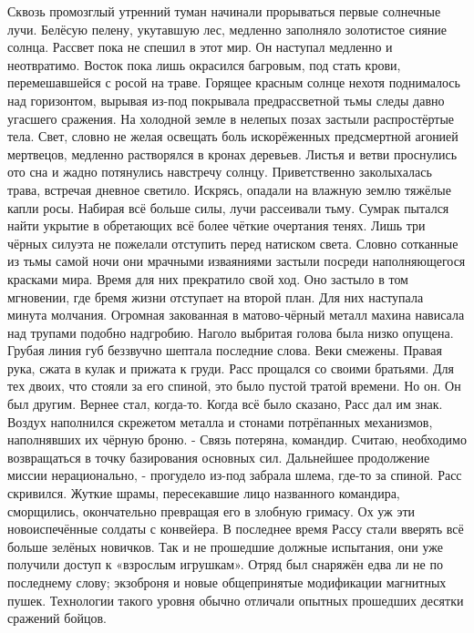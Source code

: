 \documentclass[a4paper, 12pt]{report}
\begin{document}
Сквозь промозглый утренний туман начинали прорываться первые солнечные лучи. Белёсую пелену, укутавшую лес, медленно заполняло золотистое сияние солнца. Рассвет пока не спешил в этот мир. Он наступал медленно и неотвратимо. Восток пока лишь окрасился багровым, под стать крови, перемешавшейся с росой на траве. Горящее красным солнце нехотя поднималось над горизонтом, вырывая из-под покрывала предрассветной тьмы следы давно угасшего сражения. На холодной земле в нелепых позах застыли распростёртые тела. Свет, словно не желая освещать боль искорёженных предсмертной агонией мертвецов, медленно растворялся в кронах деревьев. Листья и ветви проснулись ото сна и жадно потянулись навстречу солнцу. Приветственно заколыхалась трава, встречая дневное светило. Искрясь, опадали на влажную землю тяжёлые капли росы. Набирая всё больше силы, лучи рассеивали тьму. Сумрак пытался найти укрытие в обретающих всё более чёткие очертания тенях. Лишь три чёрных силуэта  не пожелали отступить перед натиском света. Словно сотканные из тьмы самой ночи они мрачными изваяниями застыли посреди наполняющегося красками мира. Время для них прекратило свой ход. Оно застыло в том мгновении, где бремя жизни отступает на второй план.
Для них наступала минута молчания.
	Огромная закованная в матово-чёрный металл махина нависала над трупами подобно надгробию. Наголо выбритая голова была низко опущена. Грубая линия губ беззвучно шептала последние слова. Веки смежены. Правая рука, сжата в кулак и прижата к груди. Расс прощался со своими братьями. Для тех двоих, что стояли за его спиной, это было пустой тратой времени. Но он. Он был другим. Вернее стал, когда-то.
Когда всё было сказано, Расс дал им знак. Воздух наполнился скрежетом металла и стонами потрёпанных механизмов, наполнявших их чёрную броню.
- Связь потеряна, командир. Считаю, необходимо возвращаться в точку базирования основных сил. Дальнейшее продолжение миссии нерационально, - прогудело из-под забрала шлема, где-то за спиной. 
Расс скривился. Жуткие шрамы, пересекавшие лицо названного командира, сморщились, окончательно превращая его в злобную гримасу. Ох уж эти  новоиспечённые солдаты с конвейера. В последнее время Рассу стали вверять всё больше зелёных новичков. Так и не прошедшие должные испытания, они уже получили доступ к «взрослым игрушкам». Отряд был снаряжён едва ли не по последнему слову; экзоброня и новые общепринятые модификации магнитных пушек. Технологии такого уровня обычно отличали опытных прошедших десятки сражений бойцов.
\end{document}
